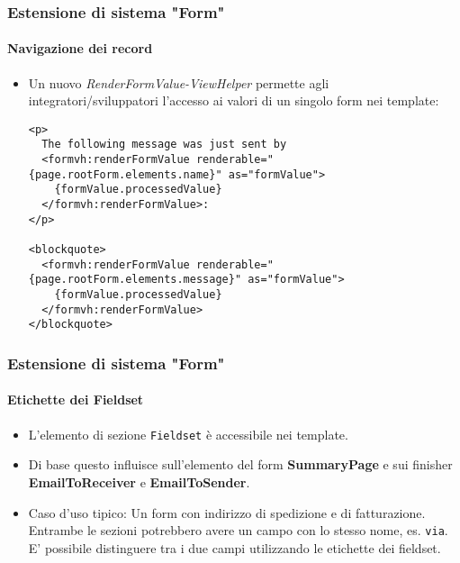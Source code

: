 
\begin{frame}[fragile]
	\frametitle{Estensione di sistema "Form"}
	\framesubtitle{Navigazione dei record}

	\lstset{basicstyle=\tiny\ttfamily}

	\begin{itemize}
		\item Un nuovo \textit{RenderFormValue-ViewHelper} permette agli integratori/sviluppatori l'accesso ai valori di un singolo form nei template:
\begin{lstlisting}
<p>
  The following message was just sent by
  <formvh:renderFormValue renderable="{page.rootForm.elements.name}" as="formValue">
    {formValue.processedValue}
  </formvh:renderFormValue>:
</p>

<blockquote>
  <formvh:renderFormValue renderable="{page.rootForm.elements.message}" as="formValue">
    {formValue.processedValue}
  </formvh:renderFormValue>
</blockquote>
\end{lstlisting}

	\end{itemize}

\end{frame}


\begin{frame}[fragile]
	\frametitle{Estensione di sistema "Form"}
	\framesubtitle{Etichette dei Fieldset}

	\begin{itemize}
		\item L'elemento di sezione \texttt{Fieldset} è accessibile nei template.
		\item Di base questo influisce sull'elemento del form \textbf{SummaryPage} e sui finisher \textbf{EmailToReceiver} e \textbf{EmailToSender}.
		\item Caso d'uso tipico:\newline
			\small
				Un form con indirizzo di spedizione e di fatturazione. Entrambe le sezioni potrebbero avere un campo con lo stesso nome, es. \texttt{via}.
				E' possibile distinguere tra i due campi utilizzando le etichette dei fieldset.
			\normalsize

	\end{itemize}

\end{frame}

